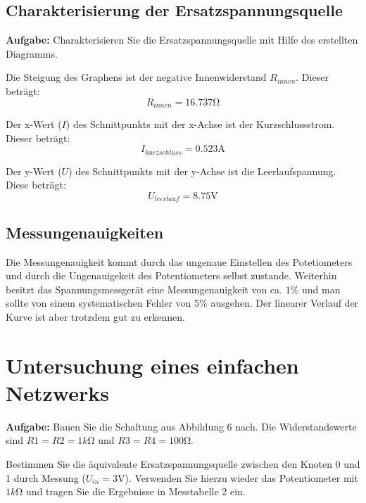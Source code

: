 \documentclass[10pt]{report}
\begin{document}
        \subsection{Charakterisierung der Ersatzspannungsquelle}
        \textbf{Aufgabe:} Charakterisieren Sie die Ersatzspannungsquelle mit Hilfe des erstellten Diagramms.

        \vspace{0.5cm}

        Die Steigung des Graphens ist der negative Innenwiderstand $R_{innen}$.
        Dieser beträgt:
        \begin{equation*}
            R_{innen} = 16.737 \si{\ohm}
        \end{equation*}

        Der x-Wert ($I$) des Schnittpunkts mit der x-Achse ist der Kurzschlussstrom.
        Dieser beträgt:
        \begin{equation*}
            I_{kurzschluss} = 0.523 \si{\ampere}
        \end{equation*}

        Der y-Wert ($U$) des Schnittpunkts mit der y-Achse ist die Leerlaufspannung.
        Diese beträgt:
        \begin{equation*}
            U_{leerlauf} = 8.75 \si{\volt}
        \end{equation*}

        \subsection{Messungenauigkeiten}
        Die Messungenauigkeit kommt durch das ungenaue Einstellen des Potetiometers
        und durch die Ungenauigekeit des Potentiometers selbst zustande. Weiterhin besitzt
		das Spannungsmessgerät eine Messungenauigkeit von ca. $1\%$ und man sollte von einem
		systematischen Fehler von $5\%$ ausgehen. Der linearer Verlauf der Kurve ist aber
		trotzdem gut zu erkennen.


        \section{Untersuchung eines einfachen Netzwerks}
        \textbf{Aufgabe: }Bauen Sie die Schaltung aus Abbildung 6 nach. Die Widerstandswerte sind $R1 = R2 =
        1 \si{k\ohm}$ und $R3 = R4 = 100\si{\ohm}$.

        Bestimmen Sie die äquivalente Ersatzspannungsquelle zwischen den Knoten 0 und 1 durch
        Messung ($U_{in} = 3\si{\volt}$). Verwenden Sie hierzu wieder das Potentiometer mit $1\si{k\ohm}$ und tragen
        Sie die Ergebnisse in Messtabelle 2 ein.
\end{document}
